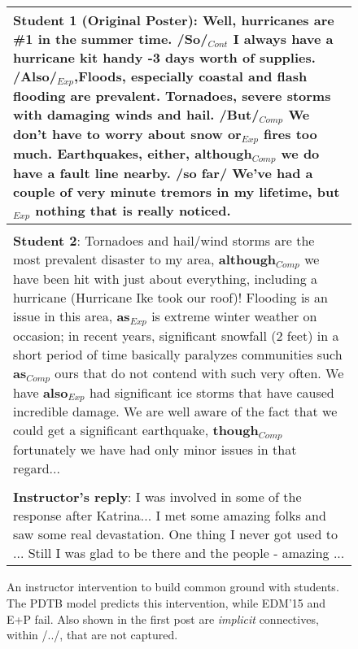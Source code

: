 \documentclass[letterpaper]{article}
\begin{document}
\begin{figure}[t]
\small 
\begin{tabular}{|p{7.8cm}|}
\hline 
\textbf{Student 1 (Original Poster)}: Well, hurricanes are \#1 in the summer time. 
/\textbf{So}/$_{Cont}$ I always have a hurricane kit handy 
-3 days worth of supplies. 
/\textbf{Also}/$_{Exp}$,Floods, especially coastal and flash flooding are 
prevalent. Tornadoes, severe storms with damaging winds and hail. 
/\textbf{But}/$_{Comp}$ We don't have to worry about 
snow \textbf{or}$_{Exp}$ fires too much. Earthquakes, either, 
\textbf{although}$_{Comp}$ we do have a fault line 
nearby. /\textbf{so far}/ We've had a couple of very minute tremors 
in my lifetime, \textbf{but}$_{Exp}$ nothing that is really noticed.  \\

\hline \\

\textbf{Student 2}: Tornadoes and hail/wind storms are the most prevalent 
disaster to my area, \textbf{although}$_{Comp}$ we have been hit with just 
about everything, including a hurricane (Hurricane Ike took our roof)! 
Flooding is an issue in this area, \textbf{as}$_{Exp}$ is extreme winter 
weather on occasion; in recent years, significant snowfall (2 feet) in a short 
period of time basically paralyzes communities such \textbf{as}$_{Comp}$ ours 
that do not contend with such very often. We have \textbf{also}$_{Exp}$ had 
significant ice storms that have caused incredible damage. We are well aware 
of the fact that we could get a significant earthquake, 
\textbf{though}$_{Comp}$ fortunately we have 
had only minor issues in that regard...  \\

\hline \\

\textbf{Instructor's reply}: I was involved in some of the response
after Katrina...  I met some amazing folks and saw some real
devastation. One thing I never got used to ... Still I was glad to be
there and the people - amazing ...  \\

\hline
\end{tabular}
\caption{An instructor intervention to build common ground with students. The 
PDTB model predicts this intervention, while EDM'15 and E+P fail. Also shown 
in the first post are \textit{implicit} connectives, within /../, that are not
captured.
}
\label{fig:example-pdtb}
\end{figure}
\end{document}
